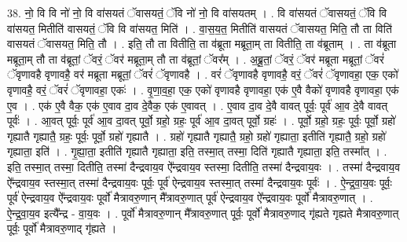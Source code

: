 \documentclass[17pt]{extarticle}
\begin{document}
38. नो॒ वि वि नो॑ नो॒ वि वा॑सयतं ॅवासयतं॒ ॅवि नो॑ नो॒ वि वा॑सयतम् । . वि वा॑सयतं ॅवासयतं॒ ॅवि वि वा॑सयत॒ मितीति॑ वासयतं॒ ॅवि वि वा॑सयत॒ मिति॑ । . वा॒स॒य॒त॒ मितीति॑ वासयतं ॅवासयत॒ मिति॒ तौ ता विति॑ वासयतं ॅवासयत॒ मिति॒ तौ । . इति॒ तौ ता वितीति॒ ता व॑ब्रूता मब्रूता॒म् ता वितीति॒ ता व॑ब्रूताम् । . ता व॑ब्रूता मब्रूता॒म् तौ ता व॑ब्रूतां॒ ॅवरं॒ ॅवर॑ मब्रूता॒म् तौ ता व॑ब्रूतां॒ ॅवर᳚म् । . अ॒ब्रू॒तां॒ ॅवरं॒ ॅवर॑ मब्रूता मब्रूतां॒ ॅवरं॑ ॅवृणावहै वृणावहै॒ वर॑ मब्रूता मब्रूतां॒ ॅवरं॑ ॅवृणावहै । . वरं॑ ॅवृणावहै वृणावहै॒ वरं॒ ॅवरं॑ ॅवृणावहा॒ एक॒ एको॑ वृणावहै॒ वरं॒ ॅवरं॑ ॅवृणावहा॒ एकः॑ । . वृ॒णा॒व॒हा॒ एक॒ एको॑ वृणावहै वृणावहा॒ एक॑ ए॒वै वैको॑ वृणावहै वृणावहा॒ एक॑ ए॒व । . एक॑ ए॒वै वैक॒ एक॑ ए॒वाव दा॒व दे॒वैक॒ एक॑ ए॒वावत् । . ए॒वाव दा॒व दे॒वै वावत् पूर्वः॒ पूर्व॑ आ॒व दे॒वै वावत् पूर्वः॑ । . आ॒वत् पूर्वः॒ पूर्व॑ आ॒व दा॒वत् पूर्वो॒ ग्रहो॒ ग्रहः॒ पूर्व॑ आ॒व दा॒वत् पूर्वो॒ ग्रहः॑ । . पूर्वो॒ ग्रहो॒ ग्रहः॒ पूर्वः॒ पूर्वो॒ ग्रहो॑ गृह्यातै गृह्यातै॒ ग्रहः॒ पूर्वः॒ पूर्वो॒ ग्रहो॑ गृह्यातै । . ग्रहो॑ गृह्यातै गृह्यातै॒ ग्रहो॒ ग्रहो॑ गृह्याता॒ इतीति॑ गृह्यातै॒ ग्रहो॒ ग्रहो॑ गृह्याता॒ इति॑ । . गृ॒ह्या॒ता॒ इतीति॑ गृह्यातै गृह्याता॒ इति॒ तस्मा॒त् तस्मा॒ दिति॑ गृह्यातै गृह्याता॒ इति॒ तस्मा᳚त् । . इति॒ तस्मा॒त् तस्मा॒ दितीति॒ तस्मा॑ दैन्द्रवाय॒व ऐ᳚न्द्रवाय॒व स्तस्मा॒ दितीति॒ तस्मा॑ दैन्द्रवाय॒वः । . तस्मा॑ दैन्द्रवाय॒व ऐ᳚न्द्रवाय॒व स्तस्मा॒त् तस्मा॑ दैन्द्रवाय॒वः पूर्वः॒ पूर्व॑ ऐन्द्रवाय॒व स्तस्मा॒त् तस्मा॑ दैन्द्रवाय॒वः पूर्वः॑ । . ऐ॒न्द्र॒वा॒य॒वः पूर्वः॒ पूर्व॑ ऐन्द्रवाय॒व ऐ᳚न्द्रवाय॒वः पूर्वो॑ मैत्रावरु॒णान् मै᳚त्रावरु॒णात् पूर्व॑ ऐन्द्रवाय॒व ऐ᳚न्द्रवाय॒वः पूर्वो॑ मैत्रावरु॒णात् । . ऐ॒न्द्र॒वा॒य॒व इत्यै᳚न्द्र - वा॒य॒वः । . पूर्वो॑ मैत्रावरु॒णान् मै᳚त्रावरु॒णात् पूर्वः॒ पूर्वो॑ मैत्रावरु॒णाद् गृ॑ह्यते गृह्यते मैत्रावरु॒णात् पूर्वः॒ पूर्वो॑ मैत्रावरु॒णाद् गृ॑ह्यते । \newline
\end{document}
